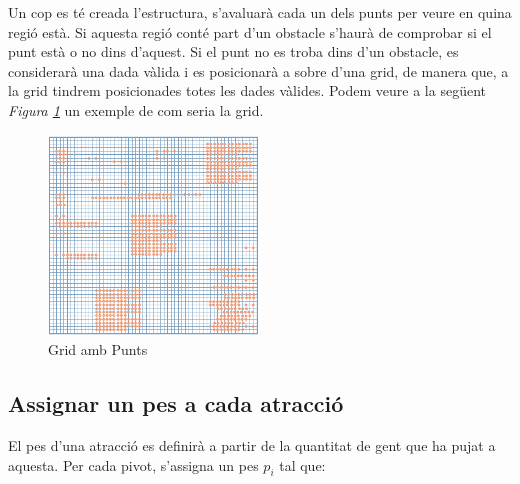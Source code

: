 \documentclass[12pt]{article}
\begin{document}




Un cop es té creada l'estructura, s'avaluarà cada un dels punts per veure en quina regió està. Si aquesta regió conté part d'un obstacle s'haurà de comprobar si el punt està o no dins d'aquest. Si el punt no es troba dins d'un obstacle, es considerarà una dada vàlida i es posicionarà a sobre d'una grid, de manera que, a la grid tindrem posicionades totes les dades vàlides. Podem veure a la següent \textit{Figura \ref{fig:grid_amb_punts}} un exemple de com seria la grid.

\begin{figure}[H]
	\centering
	\includegraphics[width=0.5\textwidth]{imatges/grid_amb_punts.png}\par\vspace{1cm}
	\caption{Grid amb Punts}
	\label{fig:grid_amb_punts}
\end{figure}

\subsection{Assignar un pes a cada atracció}
El pes d'una atracció es definirà a partir de la quantitat de gent que ha pujat a aquesta. Per cada pivot, s'assigna un pes $p_{i}$ tal que:
 
\end{document}
